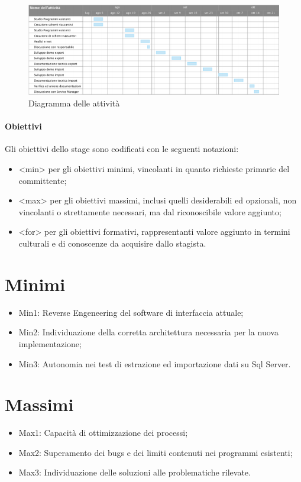 \begin{figure}[!h]
\thispagestyle{empty}
\centering
\includegraphics[scale=0.85]{img/Gantt.png}
\caption{Diagramma delle attività}
\end{figure}
\newpage

\subsubsection{Obiettivi}
Gli obiettivi dello stage sono codificati con le seguenti notazioni:
\begin{itemize}
\item <min> per gli obiettivi minimi, vincolanti in quanto richieste primarie del committente;
\item <max> per gli obiettivi massimi, inclusi quelli desiderabili ed opzionali, non vincolanti o strettamente necessari, ma dal riconoscibile valore aggiunto;
\item <for> per gli obiettivi formativi, rappresentanti valore aggiunto in termini culturali e di conoscenze da acquisire dallo stagista.
\end{itemize}

\chapter{Minimi}
\begin{itemize}
\item Min1: Reverse Engeneering del software di interfaccia attuale;
\item Min2: Individuazione della corretta architettura necessaria per la nuova implementazione;
\item Min3: Autonomia nei test di estrazione ed importazione dati su Sql Server.
\end{itemize}

\chapter{Massimi}
\begin{itemize}
\item Max1: Capacità di ottimizzazione dei processi;
\item Max2: Superamento dei bugs e dei limiti contenuti nei programmi esistenti;
\item Max3: Individuazione delle soluzioni alle problematiche rilevate.
\end{itemize}

